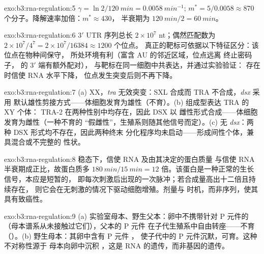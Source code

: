 \begin{solution}{exo:b3:rna-regulation:5}
$\gamma = \ln 2/\qty{120}{min} = \qty{0.0058}{min^{-1}}$; $m^{*} =
5/0.0058 \approx 870$ 个分子。降解速率加倍：$m^{*} \approx 430$，
半衰期为 $\qty{120}{min}/2 = \qty{60}{min}$。
\end{solution}

\begin{solution}{exo:b3:rna-regulation:6}
3$'$ UTR 序列总长 $2\times 10^{7}$ nt；偶然匹配数为 $2\times
10^{7}/4^{7} = 2\times 10^{7}/\num{16384} \approx \num{1200}$ 个位点。
真正的靶标可依据以下特征区分：该位点在物种间保守，
所处环境有利（富含 AU 的邻近区域，位点远离
终止密码子， 的 3$'$ 端有额外配对），
 与靶标在同一细胞中共表达，并通过实验验证：
存在  时信使 RNA 水平下降，
位点发生突变后则不再下降。
\end{solution}

\begin{solution}{exo:b3:rna-regulation:7}
(a) XX，\emph{tra} 无效突变：SXL 合成而 TRA 不合成，\emph{dsx} 采用
默认雄性剪接方式——体细胞发育为雄性（不育）。(b) 组成型表达 TRA 的 XY 个体：
TRA-2 在两种性别中均存在，因此 DSX 以
雌性形式合成——体细胞发育为雌性（一种不育的
“假雌性”，生殖系则随其他信号而定）。(c) 无
\emph{dsx}：两种 DSX 形式均不存在，因此两种终末
分化程序均未启动——形成间性个体，兼具混合或不完整的
性状。
\end{solution}

\begin{solution}{exo:b3:rna-regulation:8}
稳态下，信使 RNA 及由其决定的蛋白质量
与信使 RNA 半衰期成正比，故蛋白质多 $\qty{180}{min}/\qty{15}{min} = 12$
倍。该蛋白是一种正常的生长信号，本应是短暂的，
即每次刺激后出现的一次脉冲；若合成量高出十二倍且持续存在，
则它会在无刺激的情况下驱动细胞增殖。剂量与
时机，而非序列，使其具有致癌性。
\end{solution}

\begin{solution}{exo:b3:rna-regulation:9}
(a) 实验室母本、野生父本：卵中不携带针对
P 元件的 （母本谱系从未接触过它们），父本的 P 元件
在子代生殖系中自由转座——不育
（）。(b) 野生母本：其卵中含有 P 元件 ，
使子代中的 P 元件沉默，可育。这种不对称性源于
母本向卵中沉积 ，这是 RNA 的遗传，而非基因的遗传。
\end{solution}

